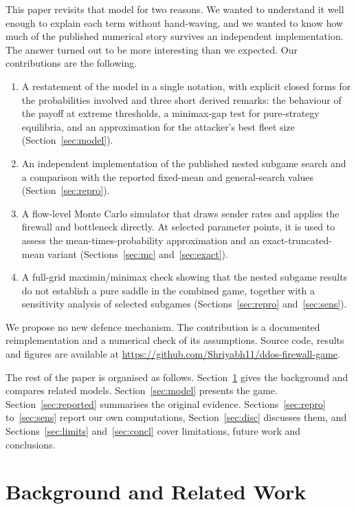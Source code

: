 \documentclass[conference]{IEEEtran}
\begin{document}
This paper revisits that model for two reasons. We wanted to understand it well enough to explain each term without hand-waving, and we wanted to know how much of the published numerical story survives an independent implementation. The answer turned out to be more interesting than we expected. Our contributions are the following.
\begin{enumerate}
\item A restatement of the model in a single notation, with explicit closed forms for the probabilities involved and three short derived remarks: the behaviour of the payoff at extreme thresholds, a minimax-gap test for pure-strategy equilibria, and an approximation for the attacker's best fleet size (Section~\ref{sec:model}).
\item An independent implementation of the published nested subgame search and a comparison with the reported fixed-mean and general-search values (Section~\ref{sec:repro}).
\item A flow-level Monte Carlo simulator that draws sender rates and applies the firewall and bottleneck directly. At selected parameter points, it is used to assess the mean-times-probability approximation and an exact-truncated-mean variant (Sections~\ref{sec:mc} and~\ref{sec:exact}).
\item A full-grid maximin/minimax check showing that the nested subgame results do not establish a pure saddle in the combined game, together with a sensitivity analysis of selected subgames (Sections~\ref{sec:repro} and~\ref{sec:sens}).
\end{enumerate}
We propose no new defence mechanism. The contribution is a documented reimplementation and a numerical check of its assumptions. Source code, results and figures are available at \url{https://github.com/Shriyabh11/ddos-firewall-game}.

The rest of the paper is organised as follows. Section~\ref{sec:bg} gives the background and compares related models. Section~\ref{sec:model} presents the game. Section~\ref{sec:reported} summarises the original evidence. Sections~\ref{sec:repro} to~\ref{sec:sens} report our own computations, Section~\ref{sec:disc} discusses them, and Sections~\ref{sec:limits} and~\ref{sec:concl} cover limitations, future work and conclusions.

\section{Background and Related Work}\label{sec:bg}
\end{document}
